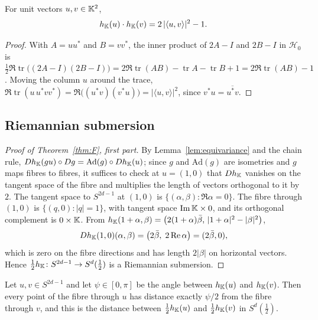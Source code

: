 \begin{proposition}\label{prop:dotproduct}
For unit vectors $u,v\in\mathbb{K}^2$,
\[
h_{\mathbb{K}}(u)\cdot h_{\mathbb{K}}(v)=2\,|\langle u,v\rangle|^2-1 .
\]
\end{proposition}

\begin{proof}
With $A=uu^*$ and $B=vv^*$, the inner product of $2A-I$ and $2B-I$ in $\mathcal H_0$ is $\tfrac12\Re\operatorname{tr}\bigl((2A-I)(2B-I)\bigr)=2\Re\operatorname{tr}(AB)-\operatorname{tr}A-\operatorname{tr}B+1=2\Re\operatorname{tr}(AB)-1$. Moving the column $u$ around the trace, $\Re\operatorname{tr}(u\,u^*vv^*)=\Re\bigl((u^*v)(v^*u)\bigr)=|\langle u,v\rangle|^2$, since $v^*u=\overline{u^*v}$.
\end{proof}

\subsection{Riemannian submersion}\label{sec:submersion}

\begin{proof}[Proof of Theorem~\ref{thm:F}, first part]
By Lemma~\ref{lem:equivariance} and the chain rule, $Dh_{\mathbb{K}}(gu)\circ Dg=\mathrm{Ad}(g)\circ Dh_{\mathbb{K}}(u)$; since $g$ and $\mathrm{Ad}(g)$ are isometries and $g$ maps fibres to fibres, it suffices to check at $u=(1,0)$ that $Dh_{\mathbb{K}}$ vanishes on the tangent space of the fibre and multiplies the length of vectors orthogonal to it by $2$. The tangent space to $S^{2d-1}$ at $(1,0)$ is $\{(\alpha,\beta):\Re\alpha=0\}$. The fibre through $(1,0)$ is $\{(q,0):|q|=1\}$, with tangent space $\operatorname{Im}\mathbb{K}\times0$, and its orthogonal complement is $0\times\mathbb{K}$. From $h_{\mathbb{K}}(1+\alpha,\beta)=\bigl(2(1+\alpha)\bar\beta,\,|1+\alpha|^2-|\beta|^2\bigr)$,
\[
Dh_{\mathbb{K}}(1,0)(\alpha,\beta)=\bigl(2\bar\beta,\;2\operatorname{Re}\alpha\bigr)=(2\bar\beta,0),
\]
which is zero on the fibre directions and has length $2|\beta|$ on horizontal vectors. Hence $\tfrac12h_{\mathbb{K}}\colon S^{2d-1}\to S^d(\tfrac12)$ is a Riemannian submersion.
\end{proof}

\begin{proposition}\label{prop:parallel}
Let $u,v\in S^{2d-1}$ and let $\psi\in[0,\pi]$ be the angle between $h_{\mathbb{K}}(u)$ and $h_{\mathbb{K}}(v)$. Then every point of the fibre through $u$ has distance exactly $\psi/2$ from the fibre through $v$, and this is the distance between $\tfrac12h_{\mathbb{K}}(u)$ and $\tfrac12h_{\mathbb{K}}(v)$ in $S^d(\tfrac12)$.
\end{proposition}

